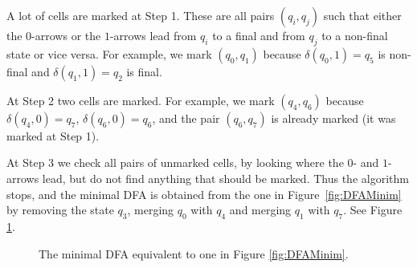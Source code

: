 \begin{exl}
A lot of cells are marked at Step 1.
These are all pairs $(q_i, q_j)$ such that either the $0$-arrows or the $1$-arrows lead from $q_i$ to a final and from $q_j$ to a non-final state or vice versa.
For example, we mark $(q_0, q_1)$ because $\delta(q_0, 1) = q_5$ is non-final and $\delta(q_1, 1) = q_2$ is final.

At Step 2 two cells are marked.
For example, we mark $(q_4, q_6)$ because $\delta(q_4, 0) = q_7$, $\delta(q_6, 0) = q_6$, and the pair $(q_6, q_7)$ is already marked (it was marked at Step 1).

At Step 3 we check all pairs of unmarked cells, by looking where the $0$- and $1$-arrows lead, but do not find anything that should be marked.
Thus the algorithm stops, and the minimal DFA is obtained from the one in Figure~\ref{fig:DFAMinim} by removing the state $q_3$,
merging $q_0$ with $q_4$ and merging $q_1$ with $q_7$. See Figure \ref{fig:DFAMinimResult}.

\begin{figure}[ht]
\begin{center}

\end{center}
\caption{The minimal DFA equivalent to one in Figure \ref{fig:DFAMinim}.}
\label{fig:DFAMinimResult}
\end{figure}
\end{exl}

